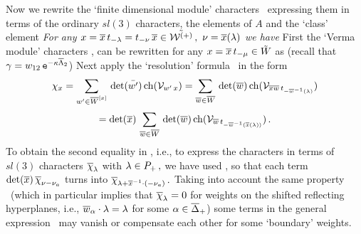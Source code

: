 Now we rewrite the `finite dimensional module' characters
\res\ expressing them in terms of the ordinary $sl(3)$
characters, the elements of $A$ and the `class' element
%
\eqn{}
%
  {\it For any $ x = \overline{x}
\,t_{-\lambda}=t_{-\nu}\,\overline{x}  \in \tilde{{\cal W}^{(+)}}\,, \ \nu=\overline{x}(\lambda)$ we
have } 
%
\eqn{}
%
\medskip
\PROOF 
First the  `Verma module'  characters \cha, \chaa{} can be
rewritten for any $x= \overline{x} \,t_{-\mu} \in \tilde W$  as (recall that
$\zg=w_{12}\,\ts-,{\fw_2}$)
%
\eqn{}
%
Next apply the `resolution' formula \res\ in the form
$$
\chi_x=
\sum_{w'\in \overline W^{[x]} }\, \det(\bar{w'})\, {\rm ch}({\cal V}_{w'\,x})=
\sum_{\overline w\in \overline W}\,\det(\overline w)\, {\rm ch}({\cal V}_{\overline{x}
\overline w\,t_{-\overline w^{-1}(\lambda)}}) 
$$
$$
=\det(\overline{x})\, \sum_{\overline w\in \overline W}\, 
\det(\overline w)\,{\rm ch}({\cal V}_{\overline w\,t_{-\overline w^{-1}(\overline{x}(\lambda))}})\,.
$$
To obtain the second equality in \fch, i.e., to
express 
the characters 
in terms of $sl(3)$ characters $\overline{\chi}_{\lambda}$ with
$\lambda\in P_+\,,$ 
we have used \winv,
so that each term $\det(\overline{x})\, \overline{\chi}_{\nu-\nu_a}$ turns into
$\overline{\chi}_{\lambda+\overline{x}^{-1}\cdot(-\nu_a)}\,.$ \endPROOF
Taking into account the same property \winv\ (which in particular
implies that
$\overline{\chi}_{\lambda} =0$ for weights on the shifted reflecting hyperplanes,
i.e., $\overline w_{\alpha}\cdot\lambda =\lambda$ for some $\alpha\in \overline\Delta_+$)
some terms in the general expression \fch\ may vanish
 or compensate each other
for some `boundary' weights.

